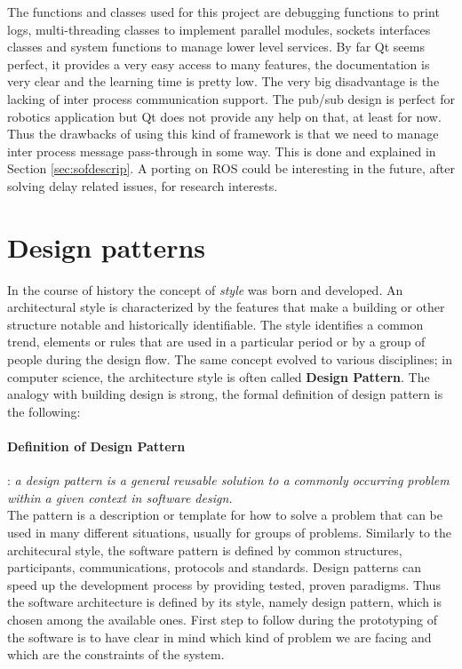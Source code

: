 The functions and classes used for this project are debugging functions to print logs, multi-threading classes to implement parallel modules, sockets interfaces classes and system functions to manage lower level services. By far Qt seems perfect, it provides a very easy access to many features, the documentation is very clear and the learning time is pretty low. The very big disadvantage is the lacking of inter process communication support. The pub/sub design is perfect for robotics application but Qt does not provide any help on that, at least for now. Thus the drawbacks of using this kind of framework is that we need to manage inter process message pass-through in some way. This is done and explained in Section \ref{sec:sofdescrip}. A porting on ROS could be interesting in the future, after solving delay related issues, for research interests.
\section{Design patterns}
\label{sec:patterns}
In the course of history the concept of \textit{style} was born and developed. An architectural style is characterized by the features that make a building or other structure notable and historically identifiable. The style identifies a common trend, elements or rules that are used in a particular period or by a group of people during the design flow. The same concept evolved to various disciplines; in computer science, the architecture style is often called \textbf{Design Pattern}. The analogy with building design is strong, the formal definition of design pattern is the following: 
\paragraph{Definition of Design Pattern}:  \textit{a design pattern is a general reusable solution to a commonly occurring problem within a given context in software design.} \\

\noindent
The pattern is a description or template for how to solve a problem that can be used in many different situations, usually for groups of problems. Similarly to the architecural style, the software pattern is defined by common structures, participants, communications, protocols and standards. Design patterns can speed up the development process by providing tested, proven paradigms. Thus the software architecture is defined by its style, namely design pattern, which is chosen among the available ones. First step to follow during the prototyping of the software is to have clear in mind which kind of problem we are facing and which are the constraints of the system. 

